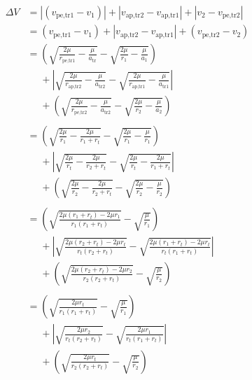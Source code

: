 \documentclass[../main.tex]{subfiles}
\begin{document}
\begin{align*}
    \Delta V & = |(v_\text{pe,tr1}-v_1)|+|v_\text{ap,tr2}-v_\text{ap,tr1}|+|v_2-v_\text{pe,tr2}|                                                                   \\
             & = (v_\text{pe,tr1}-v_1)+|v_\text{ap,tr2}-v_\text{ap,tr1}|+(v_\text{pe,tr2}-v_2)                                                                     \\
             & = \left(\sqrt{\frac{2\mu}{r_\text{pe,tr1}}-\frac{\mu}{a_\text{tr}}}-\sqrt{\frac{2\mu}{r_1}-\frac{\mu}{a_1}}\right)                                  \\
             & \phantom{=} +\left|\sqrt{\frac{2\mu}{r_\text{ap,tr2}}-\frac{\mu}{a_\text{tr2}}}-\sqrt{\frac{2\mu}{r_\text{ap,tr1}}-\frac{\mu}{a_\text{tr1}}}\right| \\
             & \phantom{=} +\left(\sqrt{\frac{2\mu}{r_\text{pe,tr2}}-\frac{\mu}{a_\text{tr2}}}-\sqrt{\frac{2\mu}{r_2}-\frac{\mu}{a_2}}\right)                      \\\\
             & = \left(\sqrt{\frac{2\mu}{r_1}-\frac{2\mu}{r_1+r_t}}-\sqrt{\frac{2\mu}{r_1}-\frac{\mu}{r_1}}\right)                                                 \\
             & \phantom{=} +\left|\sqrt{\frac{2\mu}{r_t}-\frac{2\mu}{r_2+r_t}}-\sqrt{\frac{2\mu}{r_t}-\frac{2\mu}{r_1+r_t}}\right|                                 \\
             & \phantom{=} +\left(\sqrt{\frac{2\mu}{r_2}-\frac{2\mu}{r_2+r_t}}-\sqrt{\frac{2\mu}{r_2}-\frac{\mu}{r_2}}\right)                                      \\\\
             & = \left(\sqrt{\frac{2\mu(r_1+r_t)-2\mu r_1}{r_1(r_1+r_t)}}-\sqrt{\frac{\mu}{r_1}}\right)                                                            \\
             & \phantom{=} +\left|\sqrt{\frac{2\mu(r_2+r_t)-2\mu r_t}{r_t(r_2+r_t)}}-\sqrt{\frac{2\mu(r_1+r_t)-2\mu r_t}{r_t(r_1+r_t)}}\right|                     \\
             & \phantom{=} +\left(\sqrt{\frac{2\mu(r_2+r_t)-2\mu r_2}{r_2(r_2+r_t)}}-\sqrt{\frac{\mu}{r_2}}\right)                                                 \\\\
             & = \left(\sqrt{\frac{2\mu r_t}{r_1(r_1+r_t)}}-\sqrt{\frac{\mu}{r_1}}\right)                                                                          \\
             & \phantom{=} +\left|\sqrt{\frac{2\mu r_2}{r_t(r_2+r_t)}}-\sqrt{\frac{2\mu r_1}{r_t(r_1+r_t)}}\right|                                                 \\
             & \phantom{=} +\left(\sqrt{\frac{2\mu r_t}{r_2(r_2+r_t)}}-\sqrt{\frac{\mu}{r_2}}\right)                                                               \\
\end{align*}
\end{document}
